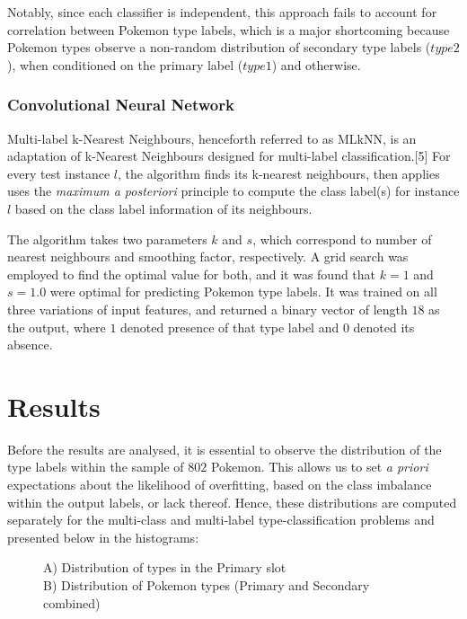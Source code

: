 \documentclass{winnower}
\begin{document}
Notably, since each classifier is independent, this approach fails to account for correlation between Pokemon type labels, which is a major shortcoming because Pokemon types observe a non-random distribution of secondary type labels ($type2$), when conditioned on the primary label ($type1$) and otherwise. 

\subsubsection{Convolutional Neural Network}
Multi-label k-Nearest Neighbours, henceforth referred to as MLkNN, is an adaptation of k-Nearest Neighbours designed for multi-label classification.[5] For every test instance $l$, the algorithm finds its k-nearest neighbours, then applies uses the \textit{maximum a posteriori} principle to compute the class label(s) for instance $l$ based on the class label information of its neighbours.

The algorithm takes two parameters $k$ and $s$, which correspond to number of nearest neighbours and smoothing factor, respectively. A grid search was employed to find the optimal value for both, and it was found that $k = 1$ and $s = 1.0$ were optimal for predicting Pokemon type labels. It was trained on all three variations of input features, and returned a binary vector of length $18$ as the output, where $1$ denoted presence of that type label and $0$ denoted its absence.

\section{Results }
Before the results are analysed, it is essential to observe the distribution of the type labels within the sample of $802$ Pokemon. This allows us to set \textit{a priori} expectations about the likelihood of overfitting, based on the class imbalance within the output labels, or lack thereof. Hence, these distributions are computed separately for the multi-class and multi-label type-classification problems and presented below in the histograms:

\begin{figure}[!htb]%
\centering
{}
\qquad
{}
\caption{A) Distribution of types in the Primary slot \\ B) Distribution of Pokemon types (Primary and Secondary combined) }


\end{figure}
\end{document}
